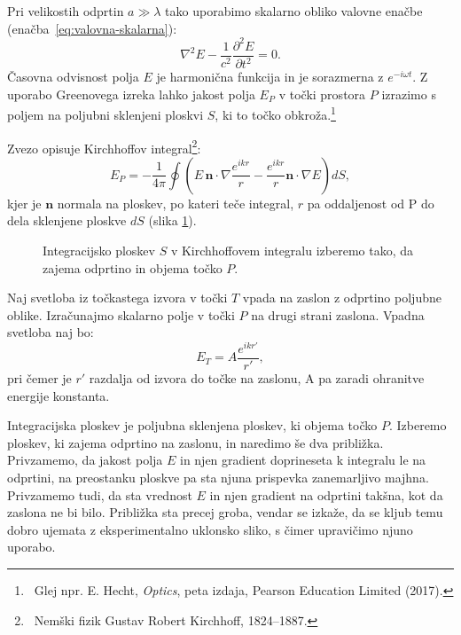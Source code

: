 Pri velikostih odprtin $a\gg\lambda$ tako uporabimo skalarno obliko valovne enačbe 
(enačba~\ref{eq:valovna-skalarna}):
\begin{equation}
\nabla^2 E - \frac{1}{c^2}\frac{\partial^2 E}{\partial t^2} = 0.
\label{eq:skalarna-valovna-enačba}
\end{equation}
Časovna odvisnost polja $E$ je harmonična funkcija in 
je sorazmerna z $e^{-i \omega t}$. Z uporabo Greeno\-ve\-ga izreka lahko
jakost polja $E_P$ v točki prostora $P$ izrazimo s poljem na 
poljubni sklenjeni ploskvi $S$, ki to točko obkroža.\footnote{~Glej npr. 
E. Hecht, {\it Optics}, peta izdaja, Pearson Education Limited (2017).} 

Zvezo opisuje Kirchhoffov integral\footnote{~Nemški fizik Gustav Robert Kirchhoff, 1824--1887.}:
\begin{equation}
E_P = -\frac{1}{4\pi}\oint \left(E\,\mathbf{n}\cdot \nabla \frac{e^{ikr}}{r}-
\frac{e^{ikr}}{r}\mathbf{n}\cdot \nabla E \right) dS,
\label{eq:Kirchhoffov-integral}
\end{equation}
kjer je $\mathbf{n}$ normala na ploskev, po kateri teče integral, $r$ pa oddaljenost od P
do dela sklenjene ploskve $dS$ (slika \ref{fig:UklonFK}). 
\begin{figure}[ht]
\centering {} 
  
\caption{Integracijsko ploskev $S$ v Kirchhoffovem integralu izberemo tako, da zajema odprtino 
in objema točko $P$.}
\label{fig:UklonFK}
\end{figure}

Naj svetloba iz točkastega izvora v točki $T$ vpada na zaslon
z odprtino poljubne oblike. Izračunajmo skalarno polje v točki $P$ na drugi 
strani zaslona. Vpadna svetloba naj bo:
\begin{equation}
\label{eq:polje-krogelni-val}
E_T = A \frac{e^{ikr'}}{r'},
\end{equation}
pri čemer je $r'$ razdalja od izvora do točke na zaslonu, A pa zaradi ohranitve energije konstanta.

Integracijska ploskev je poljubna sklenjena ploskev, ki objema točko $P$. 
Izberemo ploskev, ki zajema odprtino na zaslonu, in naredimo še dva približka. Privzamemo, da
jakost polja $E$ in njen gradient doprineseta k integralu le na odprtini, na preostanku ploskve
pa sta njuna prispevka zanemarljivo majhna. Privzamemo tudi, da sta vrednost $E$ in njen gradient 
na odprtini takšna, kot da zaslona ne bi bilo.
Približka sta precej groba, vendar se izkaže, da se kljub temu
dobro ujemata z eksperimentalno uklonsko sliko, s čimer 
upravičimo njuno uporabo.

